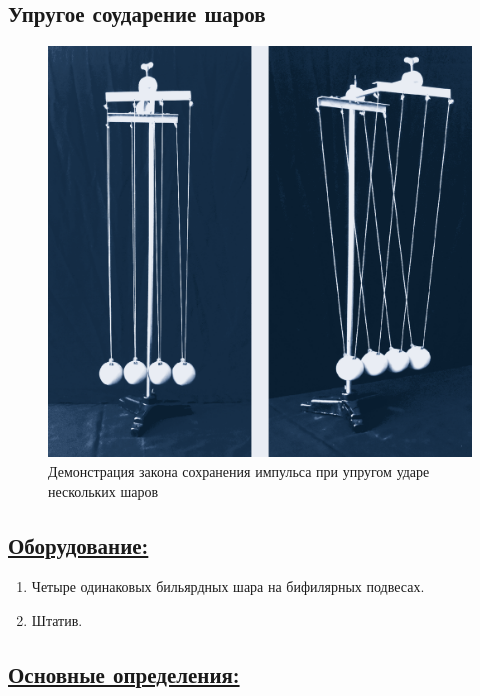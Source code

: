 \documentclass[14pt,a4paper,oneside]{extarticle}	%
\begin{document}


\begin{center}
	\subsection*{Упругое соударение шаров}
\end{center}

\begin{figure}[H]
	\centering 	
	\includegraphics[width=0.75\linewidth]{impact-1.png}
	\caption{Демонстрация закона сохранения импульса при упругом ударе нескольких шаров}
	\label{impact-1}
\end{figure}

\subsection*{\underline{Оборудование:}}

\begin{enumerate}
	\item Четыре одинаковых бильярдных шара на бифилярных подвесах.
	\item Штатив.
\end{enumerate}

\newpage
\subsection*{\underline{Основные определения:}}
\end{document}
